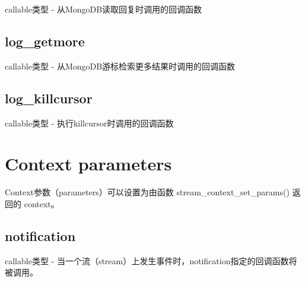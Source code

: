 callable类型 - 从MongoDB读取回复时调用的回调函数

\subsection{log\_getmore}

callable类型 - 从MongoDB游标检索更多结果时调用的回调函数

\subsection{log\_killcursor}

callable类型 - 执行killcursor时调用的回调函数



\section{Context parameters}

Context参数（parameters）可以设置为由函数 stream\_context\_set\_params() 返回的 context。

\subsection{notification}

callable类型 - 当一个流（stream）上发生事件时，notification指定的回调函数将被调用。

